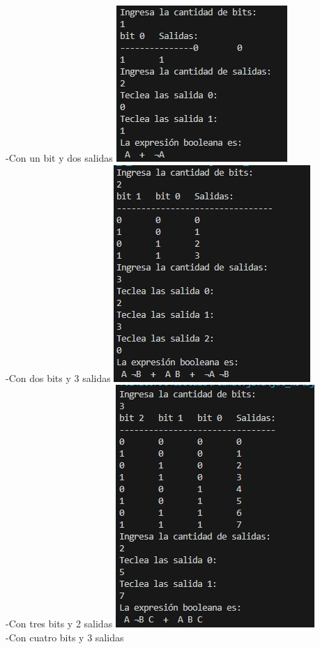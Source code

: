 \documentclass{IEEEcsmag}
\begin{document}
\begin{enumerate}
    -Con un bit y dos salidas
    \centering
    \includegraphics[width=0.5\linewidth]{./latex_imagenes/Img_ejer6_7.jpg}  \\
    -Con dos bits y 3 salidas
    \centering
    \includegraphics[width=0.5\linewidth]{./latex_imagenes/Img_ejer6_8.jpg}  \\
    -Con tres bits y 2 salidas
    \centering
    \includegraphics[width=0.5\linewidth]{./latex_imagenes/Img_ejer6_9.jpg}  \\
    -Con cuatro bits y 3 salidas

\end{enumerate}
\end{document}
